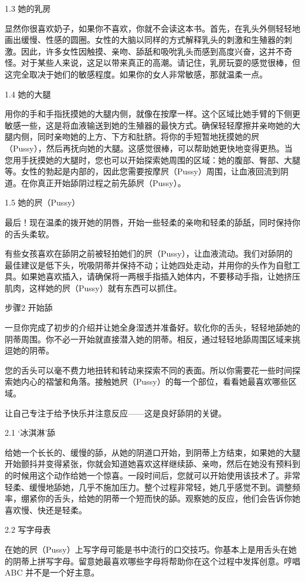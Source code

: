 \documentclass[12pt,UTF8]{ctexbook}
\begin{document}
1.3 她的乳房

显然你很喜欢奶子，如果你不喜欢，你就不会读这本书。首先，在乳头外侧轻轻地画出缓慢、性感的圆圈。女性的大脑以同样的方式解释乳头的刺激和生殖器的刺激。因此，许多女性因触摸、亲吻、舔舐和吸吮乳头而感到高度兴奋，这并不奇怪。对于某些人来说，这足以带来真正的高潮。请记住，乳房玩耍的感觉很棒，但这完全取决于她们的敏感程度。如果你的女人非常敏感，那就温柔一点。

1.4 她的大腿

用你的手和手指抚摸她的大腿内侧，就像在按摩一样。这个区域比她手臂的下侧更敏感一些，这是将血液输送到她的生殖器的最快方式。确保轻轻摩擦并亲吻她的大腿内侧，同时亲吻她的上方、下方和肚脐。将你的手短暂地抚摸她的屄（Pussy），然后再抚向她的大腿。这感觉很棒，可以帮助她更快地变得更热。当您用手抚摸她的大腿时，您也可以开始探索她周围的区域：她的腹部、臀部、大腿等。女性的勃起是内部的，因此您需要按摩屄（Pussy）周围，让血液回流到阴道。在你真正开始舔阴过程之前先舔屄（Pussy）。

1.5 她的屄（Pussy）

最后！现在温柔的拨开她的阴唇，开始一些轻柔的亲吻和轻柔的舔舐，同时保持你的舌头柔软。

有些女孩喜欢在舔阴之前被轻拍她们的屄（Pussy），让血液流动。我们对舔阴的最佳建议是低下头，吮吸阴蒂并保持不动；让她四处走动，并用你的头作为自慰工具。如果她喜欢插入，请确保将一两根手指插入她体内，不要移动手指，让她挤压肌肉，这样她的屄（Pussy）就有东西可以抓住。

步骤2 开始舔

一旦你完成了初步的介绍并让她全身湿透并准备好。软化你的舌头，轻轻地舔她的阴蒂周围。你不必一开始就直接潜入她的阴蒂。相反，通过轻轻地舔周围区域来挑逗她的阴蒂。

您的舌头可以毫不费力地扭转和转动来探索不同的表面。所以你需要花一些时间探索她内心的褶皱和角落。接触她屄（Pussy）的每一个部位，看看她最喜欢哪些区域。

让自己专注于给予快乐并注意反应——这是良好舔阴的关键。

2.1 ‘冰淇淋’舔

给她一个长长的、缓慢的舔，从她的阴道口开始，到阴蒂上方结束，如果她的大腿开始颤抖并变得紧张，你就会知道她喜欢这样继续舔、亲吻，然后在她没有预料到的时候用这个动作给她一个惊喜。一段时间后，您就可以开始使用该技术了。非常轻柔、缓慢地舔她，几乎不施加压力。整个过程非常轻，她几乎感觉不到。调整频率，绷紧你的舌头，给她的阴蒂一个短而快的舔。观察她的反应，他们会告诉你她喜欢慢、快还是轻柔。

2.2 写字母表

在她的屄（Pussy）上写字母可能是书中流行的口交技巧。你基本上是用舌头在她的阴蒂上拼写字母。留意她最喜欢哪些字母将帮助你在这个过程中发挥创意。哼唱 ABC 并不是一个好主意。
\end{document}
